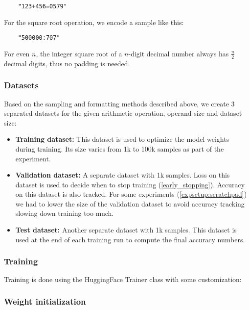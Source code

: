 \begin{lstlisting}
	"123+456=0579"
\end{lstlisting}

For the square root operation, we encode a sample like this:

\begin{lstlisting}
	"500000:707"
\end{lstlisting}

For even $n$, the integer square root of a $n$-digit decimal number always has $\frac{n}{2}$ decimal digits, thus no padding is needed.

\subsubsection{Datasets}

Based on the sampling and formatting methods described above, we create 3 separated datasets for the given arithmetic operation, operand size and dataset size:

\begin{itemize}
	\item \textbf{Training dataset:} This dataset is used to optimize the model weights during training. Its size varies from 1k to 100k samples as part of the experiment.
	\item \textbf{Validation dataset:} A separate dataset with 1k samples. Loss on this dataset is used to decide when to stop training (\cref{early_stopping}). Accuracy on this dataset is also tracked.
	For some experiments (\cref{expsetup:scratchpad}) we had to lower the size of the validation dataset to avoid accuracy tracking slowing down training too much.
	\item \textbf{Test dataset:} Another separate dataset with 1k samples. This dataset is used at the end of each training run to compute the final accuracy numbers.
\end{itemize} 

\subsubsection{Training}

Training is done using the HuggingFace Trainer class with some customization:

\subsubsection{Weight initialization}

